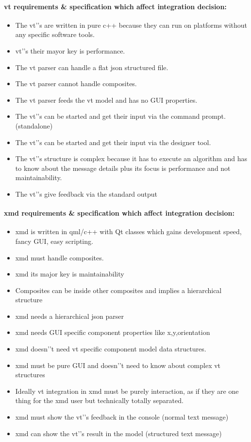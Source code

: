 \documentclass[a4paper,11pt,final]{article}
\begin{document}
\paragraph{vt requirements \& specification which affect integration decision:}
\begin{itemize}
\item The vt'’s are written in pure c++ because they can run on platforms without any specific software tools.
\item vt'’s their mayor key is performance.
\item The vt parser can handle a flat json structured file.
\item The vt parser cannot handle composites.
\item The vt parser feeds the vt model and has no GUI properties.
\item The vt'’s can be started and get their input via the command prompt. (standalone)
\item The vt'’s can be started and get their input via the designer tool.
\item The vt'’s structure is complex because it has to execute an algorithm and has to know
	about the message details plus its focus is performance and not maintainability.
\item The vt'’s give feedback via the standard output
\end{itemize}

\paragraph{xmd requirements \& specification which affect integration decision:}
\begin{itemize}
\item xmd is written in qml/c++ with Qt classes which gains development speed, fancy GUI, easy scripting.
\item xmd must handle composites.
\item xmd its major key is maintainability
\item Composites can be inside other composites and implies a hierarchical structure
\item xmd needs a hierarchical json parser
\item xmd needs GUI specific component properties like x,y,orientation
\item xmd doesn'’t need vt specific component model data structures.
\item xmd must be pure GUI and doesn'’t need to know about complex vt structures
\item Ideally vt integration in xmd must be purely interaction,  as if they are one thing for the xmd user but technically totally separated.
\item xmd must show the vt'’s feedback in the console (normal text message)
\item xmd can show the vt'’s result in the model (structured text message)
\end{itemize}
\end{document}
